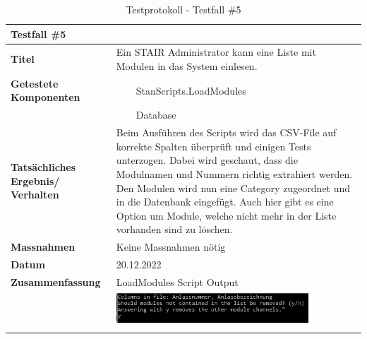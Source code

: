 \documentclass[a4paper, table]{article}
\newcommand{\tabitem}{~~\llap{\textbullet}~~}
\begin{document}
\begin{longtable}[h]{|p{9em}|p{31em}|}
    \hline
    \multicolumn{2}{|l|}{\textbf{Testfall \#5}} \\
    \hline
    \textbf{Titel} & Ein STAIR Administrator kann eine Liste mit Modulen in das System einlesen. \\
    \hline
    \textbf{Getestete Komponenten} &  
        \tabitem StanScripts.LoadModules \\*
     &  \tabitem Database \\
    \hline
    \textbf{Tatsächliches Ergebnis/ Verhalten} &  
        Beim Ausführen des Scripts wird das \gls{CSV}-File auf korrekte Spalten überprüft und einigen Tests unterzogen. 
        Dabei wird geschaut, dass die Modulnamen und Nummern richtig extrahiert werden. 
        Den Modulen wird nun eine Category zugeordnet und in die Datenbank eingefügt. 
        Auch hier gibt es eine Option um Module, welche nicht mehr in der Liste vorhanden sind zu löschen. \\
    \hline
    \textbf{Massnahmen} & Keine Massnahmen nötig\\
    \hline
    \textbf{Datum} & 20.12.2022\\
    \hline
    \textbf{Zusammenfassung} & LoadModules Script Output \\*
     &  \includegraphics[width=0.8\textwidth]{img/Tests/5_Test_LoadModules.png} \\
    \hline
    \caption{Testprotokoll - Testfall \#5}
\end{longtable}
\end{document}

